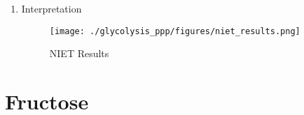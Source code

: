 \documentclass{scrartcl}
\begin{document}
\begin{enumerate}
\begin{itemize}
\item Some ammonia is released by exercising skeletal muscle directly into the circulation
\begin{itemize}
\item removed with a half-life of 20\textpm{}30 min.
\end{itemize}
\item In resting skeletal muscle ammonia is consumed rather than produced
\item \textasciitilde{}50\% of arterial ammonia can be taken up and metabolized by skeletal muscle.
\end{itemize}

\item Interpretation
\label{sec:org8592ef6}

\begin{figure}[htbp]
\centering
\texttt{[image: ./glycolysis\_ppp/figures/niet\_results.png]}
\caption[interp]{\label{fig:orgf79f62f}
NIET Results}
\end{figure}
\end{enumerate}
\section{Fructose}
\label{sec:orgd7a335d}
\end{document}
